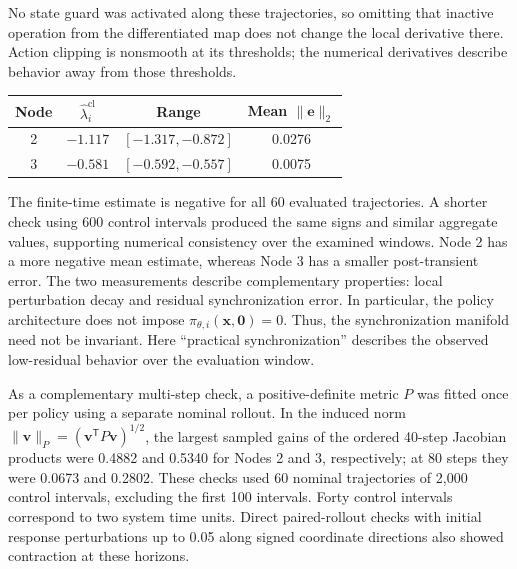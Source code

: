 \documentclass[a4paper,fleqn]{cas-dc}
\theoremstyle{plain}
\theoremstyle{definition}
\begin{document}
No state guard was activated along these trajectories, so omitting that inactive operation from the differentiated map does not change the local derivative there. Action clipping is nonsmooth at its thresholds; the numerical derivatives describe behavior away from those thresholds.

\begin{center}
	\centering
	\small
	\label{tab:closed_loop_conditional_lyapunov}
	\begin{tabular}{@{}cccc@{}}
		\toprule
		Node & $\widehat\lambda_i^{\mathrm{cl}}$ & Range & Mean $\|\mathbf{e}\|_2$ \\
		\midrule
		2 & $-1.117$ & $[-1.317,-0.872]$ & 0.0276 \\
		3 & $-0.581$ & $[-0.592,-0.557]$ & 0.0075 \\
		\bottomrule
	\end{tabular}
\end{center}

The finite-time estimate is negative for all 60 evaluated trajectories. A shorter check using 600 control intervals produced the same signs and similar aggregate values, supporting numerical consistency over the examined windows. Node 2 has a more negative mean estimate, whereas Node 3 has a smaller post-transient error. The two measurements describe complementary properties: local perturbation decay and residual synchronization error. In particular, the policy architecture does not impose $\pi_{\theta,i}(\mathbf{x},\mathbf{0})=0$. Thus, the synchronization manifold need not be invariant. Here ``practical synchronization'' describes the observed low-residual behavior over the evaluation window.


As a complementary multi-step check, a positive-definite metric $P$ was fitted once per policy using a separate nominal rollout. In the induced norm $\|\mathbf{v}\|_P=(\mathbf{v}^{\mathsf T}P\mathbf{v})^{1/2}$, the largest sampled gains of the ordered 40-step Jacobian products were 0.4882 and 0.5340 for Nodes 2 and 3, respectively; at 80 steps they were 0.0673 and 0.2802. These checks used 60 nominal trajectories of 2,000 control intervals, excluding the first 100 intervals. Forty control intervals correspond to two system time units. Direct paired-rollout checks with initial response perturbations up to 0.05 along signed coordinate directions also showed contraction at these horizons.
\end{document}
